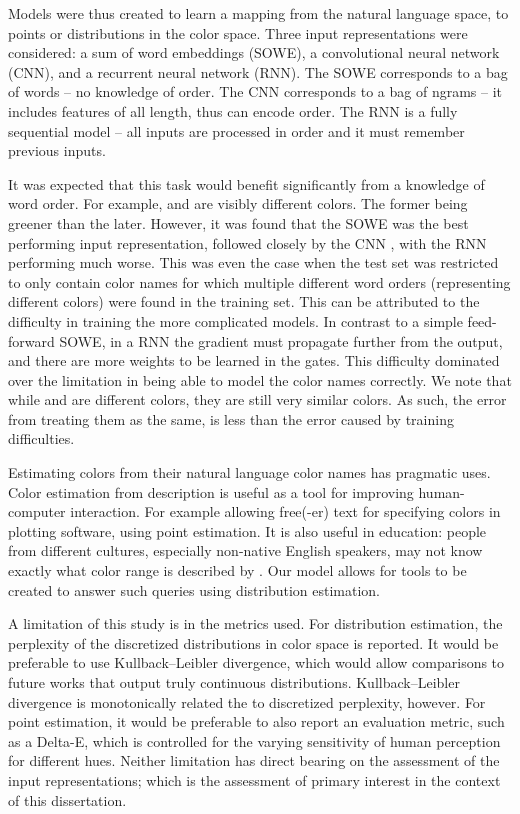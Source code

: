 \documentclass{book}
\begin{document}
Models were thus created to learn a mapping from the natural language space, to points or distributions in the color space.
Three input representations were considered: a sum of word embeddings (SOWE), a convolutional neural network (CNN), and a recurrent neural network (RNN).
The SOWE corresponds to a bag of words -- no knowledge of order.
The CNN corresponds to a bag of ngrams -- it includes features of all length, thus can encode order.
The RNN is a fully sequential model -- all inputs are processed in order and it must remember previous inputs.

It was expected that this task would benefit significantly from a knowledge of word order.
For example,  and  are visibly different colors.
The former being greener than the later.
However, it was found that the SOWE was the best performing input representation, 
followed closely by the CNN , with the RNN performing much worse.
This was even the case when the test set was restricted to only contain color names for which multiple different word orders (representing different colors) were found in the training set.
This can be attributed to the difficulty in training the more complicated models.
In contrast to a simple feed-forward SOWE, in a RNN the gradient must propagate further from the output,
and there are more weights to be learned in the gates.
This difficulty dominated over the limitation in being able to model the color names correctly.
We note that while  and  are different colors, they are still very similar colors.
As such, the error from treating them as the same, is less than the error caused by training difficulties.


Estimating colors from their natural language color names has pragmatic uses.
Color estimation from description is useful as a tool for improving human-computer interaction.
For example allowing free(-er) text for specifying colors in plotting software, using point estimation.
It is also useful in education: people from different cultures, especially non-native English speakers, may not know exactly what color range is described by .
Our model allows for tools to be created to answer such queries using distribution estimation.


A limitation of this study is in the metrics used.
For distribution estimation, the perplexity of the discretized distributions in color space is reported.
It would be preferable to use Kullback–Leibler divergence, which would allow comparisons to future works that output truly continuous distributions.
Kullback–Leibler divergence is monotonically related the to discretized perplexity, however.
For point estimation, it would be preferable to also report an evaluation metric, such as a Delta-E, which is controlled for the varying sensitivity of human perception for different hues.
Neither limitation has direct bearing on the assessment of the input representations; which is the assessment of primary interest in the context of this dissertation.
\end{document}
